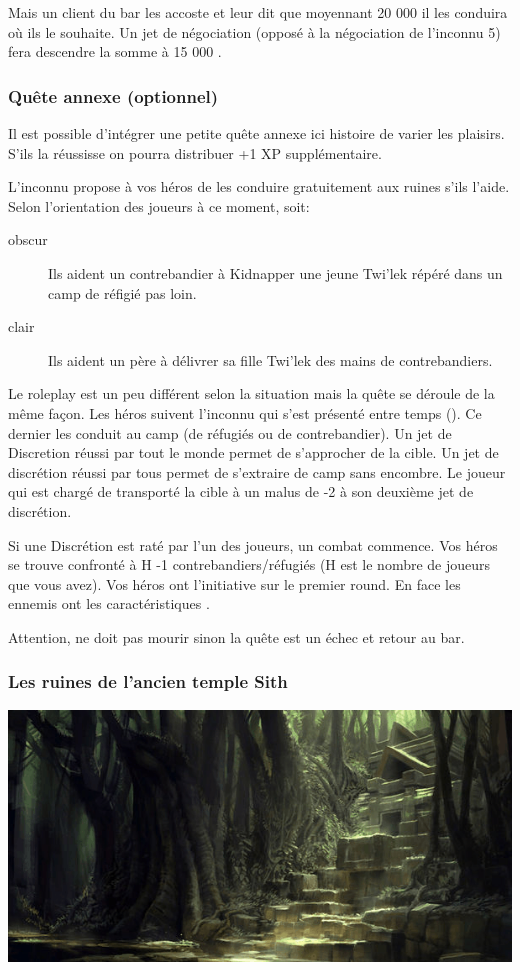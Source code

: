 Mais un client du bar les accoste et leur dit que moyennant 20 000 \crg il les conduira où ils le souhaite. Un jet de négociation (opposé à la négociation de l'inconnu 5) fera descendre la somme à 15 000 \crg.

\subsubsection{Quête annexe (optionnel)}
Il est possible d'intégrer une petite quête annexe ici histoire de varier les plaisirs. S'ils la réussisse on pourra distribuer +1 XP supplémentaire.

L'inconnu propose à vos héros de les conduire gratuitement aux ruines s'ils l'aide. Selon l'orientation des joueurs à ce moment, soit:
\begin{description}
    \item [obscur] Ils aident un contrebandier à Kidnapper une jeune Twi'lek répéré dans un camp de réfigié pas loin.
    \item [clair] Ils aident un père à délivrer sa fille Twi'lek des mains de contrebandiers.
\end{description}

Le roleplay est un peu différent selon la situation mais la quête se déroule de la même façon. Les héros suivent l'inconnu qui s'est présenté entre temps (). Ce dernier les conduit au camp (de réfugiés ou de contrebandier). Un jet de Discretion réussi par tout le monde permet de s'approcher de la cible. Un jet de discrétion réussi par tous permet de s'extraire de camp sans encombre. Le joueur qui est chargé de transporté la cible à un malus de -2 à son deuxième jet de discrétion.

Si une Discrétion est raté par l'un des joueurs, un combat commence. Vos héros se trouve confronté à H -1 contrebandiers/réfugiés (H est le nombre de joueurs que vous avez). Vos héros ont l'initiative sur le premier round. En face les ennemis ont les caractéristiques .

Attention,  ne doit pas mourir sinon la quête est un échec et retour au bar. 

\subsubsection{Les ruines de l'ancien temple Sith}
\noindent\includegraphics[width=\linewidth]{_img/dos-au-muur/taris-temple-sith.png}

